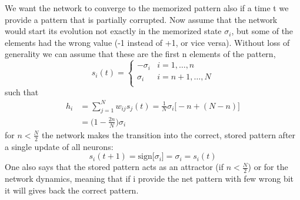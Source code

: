 We want the network to converge to the memorized pattern also if a time t we provide a pattern that is partially corrupted.
Now assume that the network would start its evolution not exactly in
the memorized state $\sigma_{i}$, but some of the elements had the wrong value (-1 instead of +1, or vice versa). Without loss of generality we can assume that these are the first n elements of the pattern,
\begin{equation}
  s_{i}(t) =
    \begin{cases}
      -\sigma_{i} & i=1,\dots,n\\
      \sigma_{i} & i=n+1,\dots,N\\
    \end{cases}       
\end{equation}
such that
\begin{equation}\begin{split}
    h_i &=\sum_{j=1}^{N} w_{ij}s_{j}(t)=\frac{1}{N}\sigma_{i}\Big[-n+(N-n)\Big]\\
    &=\big(1-\frac{2n}{N}\big)\sigma_{i}
    \label{eq:eichi2}
\end{split}
\end{equation}
 for $n < \frac{N}{2}$ the network makes the transition into the correct, stored pattern after a single update of all neurons:
\begin{equation}
     s_i(t + 1)=\text{sign}\Big[\sigma_{i}\Big]=\sigma_{i}=s_{i}(t)
\end{equation}
One also says that the stored pattern acts as an attractor (if $n < \frac{N}{2}$) or for the network dynamics, meaning that if i provide the net pattern with few wrong bit it will gives back the correct pattern.
